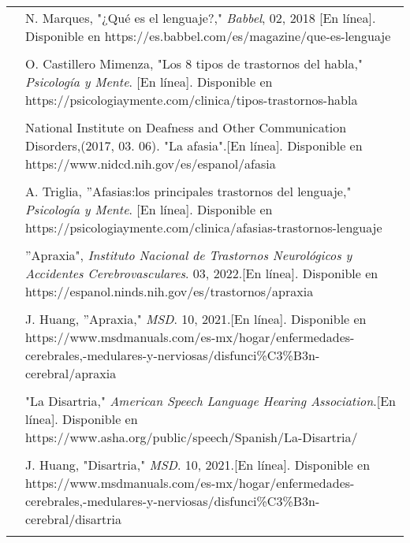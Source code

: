 \begin{tabular}{p{0.5cm} p{14.8cm}}
	\text{[1]} & N. Marques, "¿Qué es el lenguaje?," \textit{Babbel}, 02, 2018 [En línea]. Disponible en https://es.babbel.com/es/magazine/que-es-lenguaje \\ \\
	
	\text{[2]} & O. Castillero Mimenza, "Los 8 tipos de trastornos del habla," \textit{Psicología y Mente}. [En línea]. Disponible en https://psicologiaymente.com/clinica/tipos-trastornos-habla \\ \\
	
	\text{[3]} & National Institute on Deafness and Other Communication Disorders,(2017, 03. 06). "La afasia".[En línea]. Disponible en https://www.nidcd.nih.gov/es/espanol/afasia \\ \\
	
	\text{[4]} & A. Triglia, ''Afasias:los principales trastornos del lenguaje," \textit{Psicología y Mente}. [En línea]. Disponible en https://psicologiaymente.com/clinica/afasias-trastornos-lenguaje  \\ \\
	
	\text{[5]} & ''Apraxia", \textit{Instituto Nacional de Trastornos Neurológicos y Accidentes Cerebrovasculares}. 03, 2022.[En línea]. Disponible en https://espanol.ninds.nih.gov/es/trastornos/apraxia \\ \\
	
	\text{[6]} & J. Huang, ''Apraxia," \textit{MSD}. 10, 2021.[En línea]. Disponible en https://www.msdmanuals.com/es-mx/hogar/enfermedades-cerebrales,-medulares-y-nerviosas/disfunci\%C3\%B3n-cerebral/apraxia \\ \\
	
	\text{[7]} & "La Disartria," \textit{American Speech Language Hearing Association}.[En línea]. Disponible en https://www.asha.org/public/speech/Spanish/La-Disartria/ \\ \\
	
	\text{[8]} & J. Huang, "Disartria," \textit{MSD}. 10, 2021.[En línea]. Disponible en https://www.msdmanuals.com/es-mx/hogar/enfermedades-cerebrales,-medulares-y-nerviosas/disfunci\%C3\%B3n-cerebral/disartria \\ \\
	

\end{tabular}
